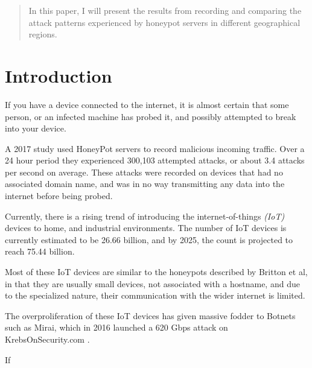 
\begin{abstract}
    In this paper, I will present the results from
    recording and comparing the attack patterns 
    experienced by honeypot servers in different 
    geographical regions. 


\end{abstract}
%
%
%
\section{Introduction}
\label{sec:introduction}

    If you have a device connected to the
    internet, it is almost certain that some person,
    or an infected machine has probed it, and possibly
    attempted to break into your device. 


    A 2017 study \cite{Britton_Liu}
    used HoneyPot servers to record malicious
    incoming traffic. Over a 24 hour period they 
    experienced 300,103 attempted attacks, or 
    about 3.4 attacks per second on average.
    These attacks were recorded on devices that
    had no associated domain name, and was in no
    way transmitting any data into the internet
    before being probed.

    
    Currently, there is a rising trend of introducing
    the internet-of-things \textit{(IoT)} devices to 
    home, and industrial environments. The number of 
    IoT devices is currently estimated to be 26.66 
    billion, and by 2025, the count is projected to 
    reach 75.44 billion. \cite{statista}

    
    Most of these IoT devices are similar to the honeypots
    described by Britton et al\cite{Britton_Liu}, in that 
    they are usually small devices, not associated with 
    a hostname, and due to the specialized nature, their 
    communication with the wider internet is limited.


    The overproliferation of these IoT devices has given 
    massive fodder to Botnets such as Mirai, which in 2016
    launched a 620 Gbps attack on KrebsOnSecurity.com
    \cite{Brian_Krebs_2016}.

    
    If